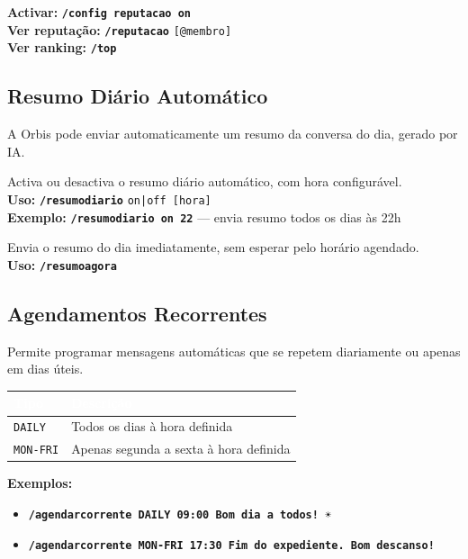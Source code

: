 \documentclass[12pt,a4paper]{article}
\newcommand{\cmd}[1]{\texttt{\textcolor{orbisblue}{\textbf{#1}}}}
\newcommand{\param}[1]{\texttt{\textcolor{orbisMid}{#1}}}
\begin{document}
\textbf{Activar:} \cmd{/config reputacao on}\\
\textbf{Ver reputação:} \cmd{/reputacao} \param{[@membro]}\\
\textbf{Ver ranking:} \cmd{/top}

\subsection{Resumo Diário Automático}

A Orbis pode enviar automaticamente um resumo da conversa do dia, gerado por IA.

\begin{tcolorbox}[cmdbox, title={\faCalendarCheck\ /resumodiario}]
Activa ou desactiva o resumo diário automático, com hora configurável.\\
\textbf{Uso:} \cmd{/resumodiario} \param{on|off [hora]}\\
\textbf{Exemplo:} \cmd{/resumodiario on 22} — envia resumo todos os dias às 22h
\end{tcolorbox}

\begin{tcolorbox}[cmdbox, title={\faPaperPlane\ /resumoagora}]
Envia o resumo do dia imediatamente, sem esperar pelo horário agendado.\\
\textbf{Uso:} \cmd{/resumoagora}
\end{tcolorbox}

\subsection{Agendamentos Recorrentes}

Permite programar mensagens automáticas que se repetem diariamente ou apenas em dias úteis.

\begin{center}
\begin{tabular}{L{3cm} L{10cm}}
\toprule
{}\textcolor{white}{\textbf{Tipo}} & \textcolor{white}{\textbf{Descrição}} \\
\midrule
\param{DAILY} & Todos os dias à hora definida \\
\param{MON-FRI} & Apenas segunda a sexta à hora definida \\
\bottomrule
\end{tabular}
\end{center}

\textbf{Exemplos:}
\begin{itemize}[leftmargin=1.5em, itemsep=2pt]
  \item \cmd{/agendarcorrente DAILY 09:00 Bom dia a todos! ☀️}
  \item \cmd{/agendarcorrente MON-FRI 17:30 Fim do expediente. Bom descanso!}
\end{itemize}
\end{document}
